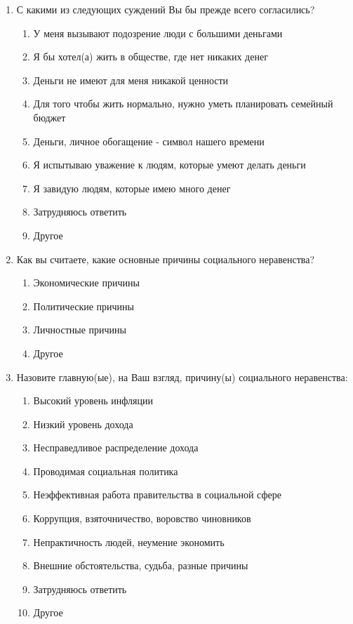 \begin{enumerate}
    \item С какими из следующих суждений Вы бы прежде всего согласились?
    \begin{enumerate}
        \item[\dline] У меня вызывают подозрение люди с большими деньгами
        \item[\dline] Я бы хотел(а) жить в обществе, где нет никаких денег
        \item[\dline] Деньги не имеют для меня никакой ценности
        \item[\dline] Для того чтобы жить нормально, нужно уметь планировать 
            семейный бюджет
        \item[\dline] Деньги, личное обогащение - символ нашего времени
        \item[\dline] Я испытываю уважение к людям, которые умеют делать 
            деньги
        \item[\dline] Я завидую людям, которые имею много денег
        \item[\dline] Затрудняюсь ответить
        \item[] Другое \hugeline 
    \end{enumerate}

    \item Как вы считаете, какие основные причины социального неравенства?
    \begin{enumerate}
        \item[\dline] Экономические причины
        \item[\dline] Политические причины
        \item[\dline] Личностные причины
        \item[] Другое \hugeline 
    \end{enumerate}

    \item Назовите главную(ые), на Ваш взгляд, причину(ы) социального 
        неравенства:
    \begin{enumerate}
        \item[\dline] Высокий уровень инфляции
        \item[\dline] Низкий уровень дохода
        \item[\dline] Несправедливое распределение дохода
        \item[\dline] Проводимая социальная политика
        \item[\dline] Неэффективная работа правительства в социальной сфере
        \item[\dline] Коррупция, взяточничество, воровство чиновников
        \item[\dline] Непрактичность людей, неумение экономить
        \item[\dline] Внешние обстоятельства, судьба, разные причины
        \item[\dline] Затрудняюсь ответить
        \item[] Другое \hugeline 
    \end{enumerate}


\end{enumerate}
